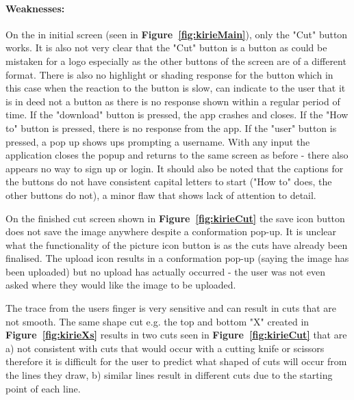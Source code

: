\documentclass[11pt]{article}
\begin{document}
                
                \paragraph{Weaknesses:}
                On the in initial screen (seen in \textbf{Figure~\ref{fig:kirieMain}}), only the "Cut" button works. It is also not very clear that the "Cut" button is a button as could be  mistaken for a logo especially as the other buttons of the screen are of a different format. There is also no highlight or shading response for the button which in this case when the reaction to the button is slow, can indicate to the user that it is in deed not a button as there is no response shown within a regular period of time. If the "download" button is pressed, the app crashes and closes. If the "How to" button is pressed, there is no response from the app. If the "user" button is pressed, a pop up shows ups prompting a username. With any input the application closes the popup and returns to the same screen as before - there also appears no way to sign up or login. It should also be noted that the captions for the buttons do not have consistent capital letters to start ("How to" does, the other buttons do not), a minor flaw that shows lack of attention to detail.
                
                On the finished cut screen shown in \textbf{Figure~\ref{fig:kirieCut}} the save icon button does not save the image anywhere despite a conformation pop-up. It is unclear what the functionality of the picture icon button is as the cuts have already been finalised. The upload icon results in a conformation pop-up (saying the image has been uploaded) but no upload has actually occurred - the user was not even asked where they would like the image to be uploaded. 
                
                The trace from the users finger is very sensitive and can result in cuts that are not smooth. The same shape cut e.g. the top and bottom "X" created in \textbf{Figure~\ref{fig:kirieXs}} results in two cuts seen in \textbf{Figure~\ref{fig:kirieCut}} that are a) not consistent with cuts that would occur with a cutting knife or scissors therefore it is difficult for the user to predict what shaped of cuts will occur from the lines they draw, b) similar lines result in different cuts due to the starting point of each line.
                
\end{document}
